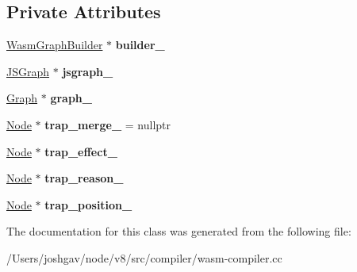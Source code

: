 \subsection*{Private Attributes}
\begin{DoxyCompactItemize}
\item 
\hyperlink{classv8_1_1internal_1_1compiler_1_1_wasm_graph_builder}{Wasm\+Graph\+Builder} $\ast$ {\bfseries builder\+\_\+}\hypertarget{classv8_1_1internal_1_1compiler_1_1_wasm_trap_helper_a49be4b95fe96012dc743446f67c27a23}{}\label{classv8_1_1internal_1_1compiler_1_1_wasm_trap_helper_a49be4b95fe96012dc743446f67c27a23}

\item 
\hyperlink{classv8_1_1internal_1_1compiler_1_1_j_s_graph}{J\+S\+Graph} $\ast$ {\bfseries jsgraph\+\_\+}\hypertarget{classv8_1_1internal_1_1compiler_1_1_wasm_trap_helper_a20095a3b63ff084fb507233658743b6f}{}\label{classv8_1_1internal_1_1compiler_1_1_wasm_trap_helper_a20095a3b63ff084fb507233658743b6f}

\item 
\hyperlink{classv8_1_1internal_1_1compiler_1_1_graph}{Graph} $\ast$ {\bfseries graph\+\_\+}\hypertarget{classv8_1_1internal_1_1compiler_1_1_wasm_trap_helper_a785a2f5ad47386fb8cdb991745ff7698}{}\label{classv8_1_1internal_1_1compiler_1_1_wasm_trap_helper_a785a2f5ad47386fb8cdb991745ff7698}

\item 
\hyperlink{classv8_1_1internal_1_1compiler_1_1_node}{Node} $\ast$ {\bfseries trap\+\_\+merge\+\_\+} = nullptr\hypertarget{classv8_1_1internal_1_1compiler_1_1_wasm_trap_helper_a813c41f90583f3bd815a1300f078bf79}{}\label{classv8_1_1internal_1_1compiler_1_1_wasm_trap_helper_a813c41f90583f3bd815a1300f078bf79}

\item 
\hyperlink{classv8_1_1internal_1_1compiler_1_1_node}{Node} $\ast$ {\bfseries trap\+\_\+effect\+\_\+}\hypertarget{classv8_1_1internal_1_1compiler_1_1_wasm_trap_helper_a480a2ddd1accf7fe101378520dcc638e}{}\label{classv8_1_1internal_1_1compiler_1_1_wasm_trap_helper_a480a2ddd1accf7fe101378520dcc638e}

\item 
\hyperlink{classv8_1_1internal_1_1compiler_1_1_node}{Node} $\ast$ {\bfseries trap\+\_\+reason\+\_\+}\hypertarget{classv8_1_1internal_1_1compiler_1_1_wasm_trap_helper_a19ef0ca472677a04d463058004fe5bc7}{}\label{classv8_1_1internal_1_1compiler_1_1_wasm_trap_helper_a19ef0ca472677a04d463058004fe5bc7}

\item 
\hyperlink{classv8_1_1internal_1_1compiler_1_1_node}{Node} $\ast$ {\bfseries trap\+\_\+position\+\_\+}\hypertarget{classv8_1_1internal_1_1compiler_1_1_wasm_trap_helper_a0bb024eb214bf229be11ff9d39a799d3}{}\label{classv8_1_1internal_1_1compiler_1_1_wasm_trap_helper_a0bb024eb214bf229be11ff9d39a799d3}

\end{DoxyCompactItemize}


The documentation for this class was generated from the following file\+:\begin{DoxyCompactItemize}
\item 
/\+Users/joshgav/node/v8/src/compiler/wasm-\/compiler.\+cc\end{DoxyCompactItemize}

